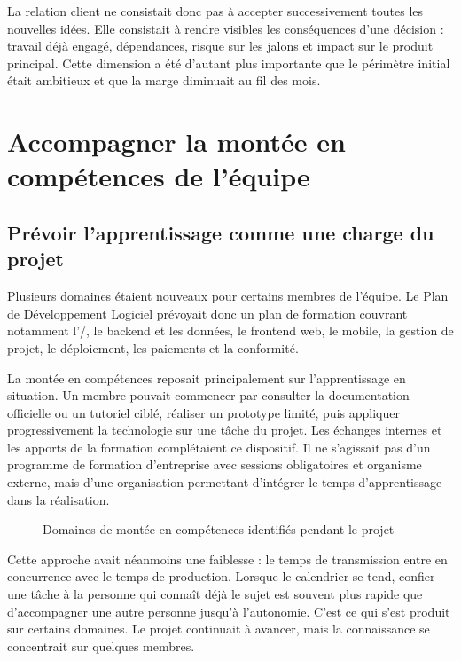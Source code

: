 La relation client ne consistait donc pas à accepter successivement toutes les nouvelles idées. Elle consistait à rendre visibles les conséquences d'une décision : travail déjà engagé, dépendances, risque sur les jalons et impact sur le produit principal. Cette dimension a été d'autant plus importante que le périmètre initial était ambitieux et que la marge diminuait au fil des mois.

\section{Accompagner la montée en compétences de l'équipe}

\subsection{Prévoir l'apprentissage comme une charge du projet}

Plusieurs domaines étaient nouveaux pour certains membres de l'équipe. Le Plan de Développement Logiciel prévoyait donc un plan de formation couvrant notamment l'/, le backend et les données, le frontend web, le mobile, la gestion de projet, le déploiement, les paiements et la conformité.

La montée en compétences reposait principalement sur l'apprentissage en situation. Un membre pouvait commencer par consulter la documentation officielle ou un tutoriel ciblé, réaliser un prototype limité, puis appliquer progressivement la technologie sur une tâche du projet. Les échanges internes et les apports de la formation complétaient ce dispositif. Il ne s'agissait pas d'un programme de formation d'entreprise avec sessions obligatoires et organisme externe, mais d'une organisation permettant d'intégrer le temps d'apprentissage dans la réalisation.

\begin{figure}[H]
\centering
{}
\caption{Domaines de montée en compétences identifiés pendant le projet}
\label{fig:lynx-formation}
\end{figure}

Cette approche avait néanmoins une faiblesse : le temps de transmission entre en concurrence avec le temps de production. Lorsque le calendrier se tend, confier une tâche à la personne qui connaît déjà le sujet est souvent plus rapide que d'accompagner une autre personne jusqu'à l'autonomie. C'est ce qui s'est produit sur certains domaines. Le projet continuait à avancer, mais la connaissance se concentrait sur quelques membres.

